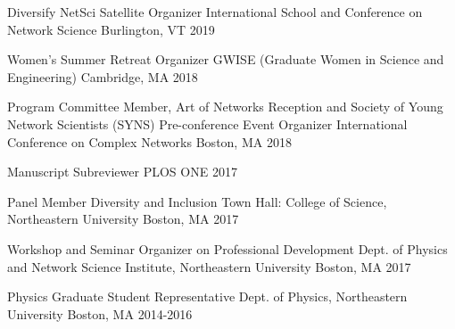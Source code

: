 
\begin{cvhonors}

\cvhonor
	{Diversify NetSci Satellite Organizer} %
	{International School and Conference on Network Science} %
	{Burlington, VT} %
	{2019} %

\cvhonor
	{Women's Summer Retreat Organizer} %
	{GWISE (Graduate Women in Science and Engineering)} %
	{Cambridge, MA} %
	{2018} %

  \cvhonor
    {Program Committee Member, Art of Networks Reception and Society of Young Network Scientists (SYNS) Pre-conference Event Organizer} %
    {International Conference on Complex Networks} %
    {Boston, MA} %
    {2018} %
    

\cvhonor
	{Manuscript Subreviewer} %
	{PLOS ONE} %
	{} %
	{2017} %

  \cvhonor
    {Panel Member} %
    {Diversity and Inclusion Town Hall: College of Science, Northeastern University} %
    {Boston, MA} %
    {2017} %
    
  \cvhonor
    {Workshop and Seminar Organizer on Professional Development} %
    {Dept. of Physics and Network Science Institute, Northeastern University} %
    {Boston, MA} %
    {2017} %
        
  \cvhonor
    {Physics Graduate Student Representative} %
    {Dept. of Physics, Northeastern University} %
    {Boston, MA} %
    {2014-2016} %
    

\end{cvhonors}
